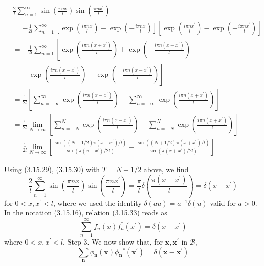 \documentclass{article}
\begin{document}
$$
\begin{align*}
& \frac{2}{l} \sum_{n=1}^{\infty} \sin \left(\frac{\pi n x}{l}\right) \sin \left(\frac{\pi n x^{\prime}}{l}\right)  \tag{3.15.32}\\
&=-\frac{1}{2 l} \sum_{n=1}^{\infty}\left[\exp \left(\frac{i \pi n x}{l}\right)-\exp \left(-\frac{i \pi n x}{l}\right)\right]\left[\exp \left(\frac{i \pi n x^{\prime}}{l}\right)-\exp \left(-\frac{i \pi n x^{\prime}}{l}\right)\right] \\
&=-\frac{1}{2 l} \sum_{n=1}^{\infty}\left[\exp \left(\frac{i \pi n\left(x+x^{\prime}\right)}{l}\right)+\exp \left(-\frac{i \pi n\left(x+x^{\prime}\right)}{l}\right)\right. \\
&\left.\quad-\exp \left(\frac{i \pi n\left(x-x^{\prime}\right)}{l}\right)-\exp \left(-\frac{i \pi n\left(x-x^{\prime}\right)}{l}\right)\right] \\
&= \frac{1}{2 l}\left[\sum_{n=-\infty}^{\infty} \exp \left(\frac{i \pi n\left(x-x^{\prime}\right)}{l}\right)-\sum_{n=-\infty}^{\infty} \exp \left(\frac{i \pi n\left(x+x^{\prime}\right)}{l}\right)\right] \\
&=\frac{1}{2 l} \lim _{N \rightarrow \infty}\left[\sum_{n=-N}^{N} \exp \left(\frac{i \pi n\left(x-x^{\prime}\right)}{l}\right)-\sum_{n=-N}^{N} \exp \left(\frac{i \pi n\left(x+x^{\prime}\right)}{l}\right)\right] \\
&=\frac{1}{2 l} \lim _{N \rightarrow \infty}\left[\frac{\sin \left((N+1 / 2) \pi\left(x-x^{\prime}\right) / l\right)}{\sin \left(\pi\left(x-x^{\prime}\right) / 2 l\right)}-\frac{\sin \left((N+1 / 2) \pi\left(x+x^{\prime}\right) / l\right)}{\sin \left(\pi\left(x+x^{\prime}\right) / 2 l\right)}\right]
\end{align*}
$$

Using (3.15.29), (3.15.30) with $T=N+1 / 2$ above, we find
$$
\begin{equation*}
\frac{2}{l} \sum_{n=1}^{\infty} \sin \left(\frac{\pi n x}{l}\right) \sin \left(\frac{\pi n x^{\prime}}{l}\right)=\frac{\pi}{l} \delta\left(\frac{\pi\left(x-x^{\prime}\right)}{l}\right)=\delta\left(x-x^{\prime}\right) \tag{3.15.33}
\end{equation*}
$$
for $0<x, x^{\prime}<l$, where we used the identity $\delta(a u)=a^{-1} \delta(u)$ valid for $a>0$. In the notation (3.15.16), relation (3.15.33) reads as
$$
\begin{equation*}
\sum_{n=1}^{\infty} f_{n}(x) f_{n}^{*}\left(x^{\prime}\right)=\delta\left(x-x^{\prime}\right) \tag{3.15.34}
\end{equation*}
$$
where $0<x, x^{\prime}<l$.
Step 3. We now show that, for $\boldsymbol{x}, \boldsymbol{x}^{\prime}$ in $\mathcal{B}$,
$$
\begin{equation*}
\sum_{\boldsymbol{n}} \phi_{\boldsymbol{n}}(\boldsymbol{x}) \phi_{\boldsymbol{n}}{ }^{*}\left(\boldsymbol{x}^{\prime}\right)=\delta\left(\boldsymbol{x}-\boldsymbol{x}^{\prime}\right) \tag{3.15.35}
\end{equation*}
$$
\end{document}
